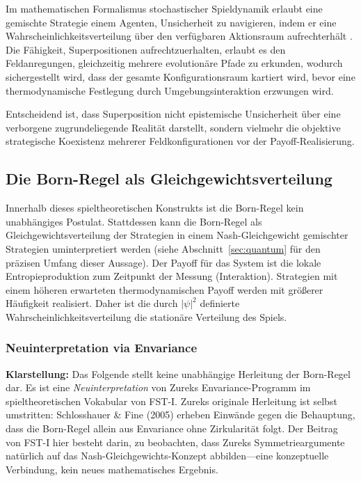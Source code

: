 \documentclass[12pt,a4paper]{article}
\theoremstyle{remark}
\begin{document}
Im mathematischen Formalismus stochastischer Spieldynamik erlaubt eine gemischte Strategie einem Agenten, Unsicherheit zu navigieren, indem er eine Wahrscheinlichkeitsverteilung \"uber den verf\"ugbaren Aktionsraum aufrechterh\"alt \citep{BusemeyerBruza2012}. Die F\"ahigkeit, Superpositionen aufrechtzuerhalten, erlaubt es den Feldanregungen, gleichzeitig mehrere evolution\"are Pfade zu erkunden, wodurch sichergestellt wird, dass der gesamte Konfigurationsraum kartiert wird, bevor eine thermodynamische Festlegung durch Umgebungsinteraktion erzwungen wird.

Entscheidend ist, dass Superposition nicht epistemische Unsicherheit \"uber eine verborgene zugrundeliegende Realit\"at darstellt, sondern vielmehr die objektive strategische Koexistenz mehrerer Feldkonfigurationen vor der Payoff-Realisierung.

\subsection{Die Born-Regel als Gleichgewichtsverteilung}

Innerhalb dieses spieltheoretischen Konstrukts ist die Born-Regel kein unabh\"angiges Postulat. Stattdessen kann die Born-Regel als Gleichgewichtsverteilung der Strategien in einem Nash-Gleichgewicht gemischter Strategien uminterpretiert werden (siehe Abschnitt~\ref{sec:quantum} f\"ur den pr\"azisen Umfang dieser Aussage). Der Payoff f\"ur das System ist die lokale Entropieproduktion zum Zeitpunkt der Messung (Interaktion). Strategien mit einem h\"oheren erwarteten thermodynamischen Payoff werden mit gr\"o\ss{}erer H\"aufigkeit realisiert. Daher ist die durch $|\psi|^2$ definierte Wahrscheinlichkeitsverteilung die station\"are Verteilung des Spiels.

\subsubsection{Neuinterpretation via Envariance}

\textbf{Klarstellung:} Das Folgende stellt keine unabh\"angige Herleitung der Born-Regel dar. Es ist eine \emph{Neuinterpretation} von Zureks Envariance-Programm \citep{Zurek2003,Zurek2005} im spieltheoretischen Vokabular von FST-I. Zureks originale Herleitung ist selbst umstritten: Schlosshauer \& Fine (2005) \citep{SchlossFine2005} erheben Einw\"ande gegen die Behauptung, dass die Born-Regel allein aus Envariance ohne Zirkularit\"at folgt. Der Beitrag von FST-I hier besteht darin, zu beobachten, dass Zureks Symmetrieargumente nat\"urlich auf das Nash-Gleichgewichts-Konzept abbilden---eine konzeptuelle Verbindung, kein neues mathematisches Ergebnis.
\end{document}
